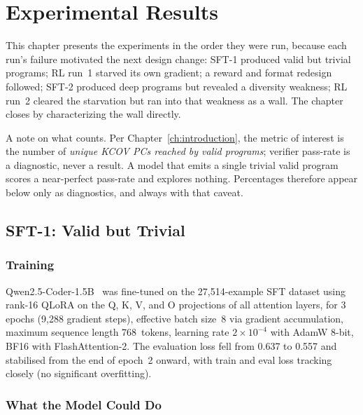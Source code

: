 \chapter{Experimental Results}
\label{ch:results}

This chapter presents the experiments in the order they were run, because each
run's failure motivated the next design change: SFT-1 produced valid but trivial
programs; RL run~1 starved its own gradient; a reward and format redesign followed;
SFT-2 produced deep programs but revealed a diversity weakness; RL run~2 cleared the
starvation but ran into that weakness as a wall. The chapter closes by
characterizing the wall directly.

A note on what counts. Per Chapter~\ref{ch:introduction}, the metric of interest is
the number of \emph{unique KCOV PCs reached by valid programs}; verifier pass-rate
is a diagnostic, never a result. A model that emits a single trivial valid program
scores a near-perfect pass-rate and explores nothing. Percentages therefore appear
below only as diagnostics, and always with that caveat.

\section{SFT-1: Valid but Trivial}
\label{sec:results-sft}

\subsection{Training}
\label{sec:sft-training}

Qwen2.5-Coder-1.5B~\cite{qwen25coder} was fine-tuned on the 27{,}514-example SFT
dataset using rank-16 QLoRA on the Q, K, V, and O projections of all attention
layers, for 3 epochs (9{,}288 gradient steps), effective batch size~8 via gradient
accumulation, maximum sequence length 768~tokens, learning rate
$2\times10^{-4}$ with AdamW 8-bit, BF16 with FlashAttention-2. The evaluation loss
fell from 0.637 to 0.557 and stabilised from the end of epoch~2 onward, with train
and eval loss tracking closely (no significant overfitting).

\subsection{What the Model Could Do}
\label{sec:sft1-capability}

